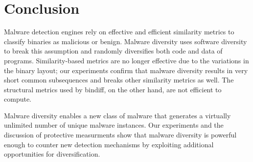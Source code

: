 \documentclass[letterpaper,twocolumn,10pt]{article}
\begin{document}
\section{Conclusion}

Malware detection engines rely on effective and efficient similarity metrics to classify
binaries as malicious or benign.  Malware diversity uses software diversity to
break this assumption and randomly diversifies both code and data of programs.
Similarity-based metrics are no longer effective due to the variations
in the binary layout; our experiments confirm that malware diversity results in
very short common subsequences and breaks other similarity metrics as well. 
The structural metrics used by bindiff, on the other hand, are not efficient
to compute.

Malware diversity enables a new class of malware that generates a virtually
unlimited number of unique malware instances.  Our experiments and the
discussion of protective measurments show that malware diversity is powerful
enough to counter new detection mechanisms by exploiting additional
opportunities for diversification.

\linespread{0.9}
{\footnotesize

}
\end{document}
